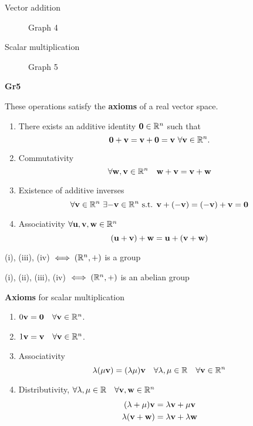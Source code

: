 \documentclass[10pt, a4paper]{article}
\begin{document}
Vector addition
\begin{figure}[H]
    \centering
    \caption{Graph 4}
    \label{fig:Gr4}
\end{figure}

Scalar multiplication
\begin{figure}[H]
    \centering
    \caption{Graph 5}
    \label{fig:Gr5}
\end{figure}
\textbf{Gr5}


These operations satisfy the \textbf{axioms} of a real vector space.
\begin{enumerate}[label = (\roman*)]
    \item There exists an additive identity $\mathbf{0} \in \mathbb{R} ^ n$ such that
    \[
    \mathbf{0 + v = v + 0 = v} \ \forall \mathbf{v} \in \mathbb{R} ^ n.
    \]
    \item Commutativity
    \[
    \forall\mathbf{w, v} \in \mathbb{R} ^ n\quad\mathbf{w + v =  v + w}
    \]
    \item Existence of additive inverses
    \[
    \forall\mathbf{v} \in \mathbb{R} ^ n\ \exists\mathbf{-v} \in \mathbb{R} ^ n \text{ s.t. } \mathbf{v + (-v) = (-v) + v = 0}
    \]
    \item Associativity
    $\forall\mathbf{u, v, w} \in \mathbb{R} ^ n$
    \[
    (\mathbf{u + v}) + \mathbf{w} = \mathbf{u} + (\mathbf{v + w})
    \]
\end{enumerate}
(i), (iii), (iv) $\iff (\mathbb{R} ^ n, +)$ is a group

(i), (ii), (iii), (iv) $\iff (\mathbb{R} ^ n, +)$ is an abelian group



\textbf{Axioms} for scalar multiplication
\begin{enumerate}[label = (\roman*)]
    \item $0\mathbf{v} = \mathbf{0}\quad\forall\mathbf{v}\in \mathbb{R} ^ n$.
    \item $1\mathbf{v} = \mathbf{v}\quad\forall\mathbf{v}\in \mathbb{R} ^ n$.
    \item Associativity
    \[
    \lambda (\mu\mathbf{v}) = (\lambda\mu)\mathbf{v}\quad\forall\lambda,\mu \in \mathbb{R}\quad\forall\mathbf{v}\in\mathbb{R} ^ n
    \]
    \item Distributivity, $\forall\lambda,\mu\in\mathbb{R}\quad\forall\mathbf{v, w} \in \mathbb{R} ^ n$
    \begin{align*}
    (\lambda + \mu)\mathbf{v} &= \lambda\mathbf{v} + \mu\mathbf{v} \\
    \lambda(\mathbf{v + w}) &= \lambda\mathbf{v} + \lambda\mathbf{w}
    \end{align*}
\end{enumerate}
\end{document}
